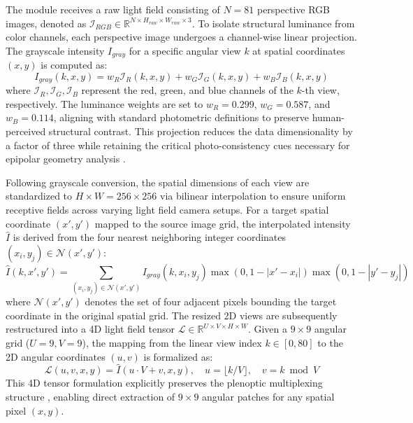\documentclass[lettersize,journal]{IEEEtran}
\begin{document}
The module receives a raw light field consisting of $N = 81$ perspective RGB images, denoted as $\mathcal{I}_{RGB} \in \mathbb{R}^{N \times H_{raw} \times W_{raw} \times 3}$. To isolate structural luminance from color channels, each perspective image undergoes a channel-wise linear projection. The grayscale intensity $I_{gray}$ for a specific angular view $k$ at spatial coordinates $(x, y)$ is computed as:
\begin{equation}
I_{gray}(k, x, y) = w_R \mathcal{I}_R(k, x, y) + w_G \mathcal{I}_G(k, x, y) + w_B \mathcal{I}_B(k, x, y)
\end{equation}
where $\mathcal{I}_R, \mathcal{I}_G, \mathcal{I}_B$ represent the red, green, and blue channels of the $k$-th view, respectively. The luminance weights are set to $w_R = 0.299$, $w_G = 0.587$, and $w_B = 0.114$, aligning with standard photometric definitions to preserve human-perceived structural contrast. This projection reduces the data dimensionality by a factor of three while retaining the critical photo-consistency cues necessary for epipolar geometry analysis \cite{wanner2014}.

Following grayscale conversion, the spatial dimensions of each view are standardized to $H \times W = 256 \times 256$ via bilinear interpolation to ensure uniform receptive fields across varying light field camera setups. For a target spatial coordinate $(x', y')$ mapped to the source image grid, the interpolated intensity $\hat{I}$ is derived from the four nearest neighboring integer coordinates $(x_i, y_j) \in \mathcal{N}(x', y')$:
\begin{equation}
\hat{I}(k, x', y') = \sum_{(x_i, y_j) \in \mathcal{N}(x', y')} I_{gray}(k, x_i, y_j) \max(0, 1 - |x' - x_i|) \max(0, 1 - |y' - y_j|)
\end{equation}
where $\mathcal{N}(x', y')$ denotes the set of four adjacent pixels bounding the target coordinate in the original spatial grid. The resized 2D views are subsequently restructured into a 4D light field tensor $\mathcal{L} \in \mathbb{R}^{U \times V \times H \times W}$. Given a $9 \times 9$ angular grid ($U=9, V=9$), the mapping from the linear view index $k \in [0, 80]$ to the 2D angular coordinates $(u, v)$ is formalized as:
\begin{equation}
\mathcal{L}(u, v, x, y) = \hat{I}\left(u \cdot V + v, x, y\right), \quad u = \lfloor k / V \rfloor, \quad v = k \bmod V
\end{equation}
This 4D tensor formulation explicitly preserves the plenoptic multiplexing structure \cite{levin2011}, enabling direct extraction of $9 \times 9$ angular patches for any spatial pixel $(x, y)$.
\end{document}
